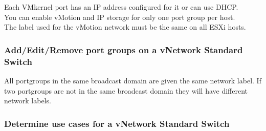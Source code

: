 Each VMkernel port has an IP address configured for it or can use DHCP.\\

You can enable vMotion and IP storage for only one port group per host.\\

The label used for the vMotion network must be the same on all ESXi hosts.

\subsubsection{Add/Edit/Remove port groups on a vNetwork Standard Switch}

All portgroups in the same broadcast domain are given the same network label.
If two portgroups are not in the same broadcast domain they will have different
network labels.

\subsubsection{Determine use cases for a vNetwork Standard Switch}
